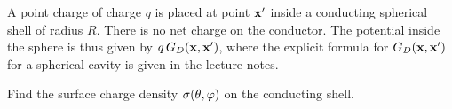 \newcommand{\vF}{\vec{F}}
\newcommand{\vE}{\vec{E}}
\newcommand{\thh}{\boldsymbol{\hat{\tht}}}
\newcommand{\phh}{\boldsymbol{\hat{\vph}}}
\newcommand{\nabx}{\nabla_{\!x}}
\newcommand{\Er}{E_r}

\begin{statement}{}
	A point charge of charge $q$ is placed at point $\mathbf{x}'$ inside a conducting spherical shell of radius $R$.  There is no net charge on the conductor.  The potential inside the sphere is thus given by $q \, G_D(\mathbf{x}, \mathbf{x}')$, where the explicit formula for $G_D(\mathbf{x}, \mathbf{x}')$ for a spherical cavity is given in the lecture notes.
\end{statement}

\begin{problem}
	Find the surface charge density $\sigma(\theta, \varphi)$ on the conducting shell.
\end{problem}

